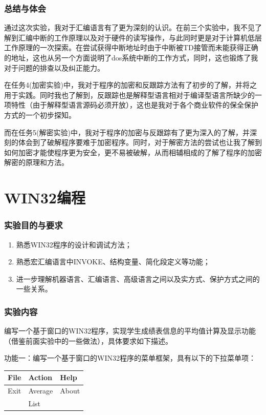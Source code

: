 \documentclass{article}
\begin{document}
	\section{总结与体会}
	通过这次实验，我对于汇编语言有了更为深刻的认识。在前三个实验中，我不见了解到汇编中断的工作原理以及对于硬件的读写操作，与此同时更是对于计算机低层工作原理的一次探索。在尝试获得中断地址时由于中断被TD接管而未能获得正确的地址，这也从另一个方面说明了dos系统中断的工作方式，同时，这也锻炼了我对于问题的排查以及纠正能力。\par
	在任务4(加密实验)中，我对于程序的加密和反跟踪方法有了初步的了解，并将之用于实践。同时我也了解到，反跟踪也是解释型语言相对于编译型语言所缺少的一项特性（由于解释型语言源码必须开放），这也是我对于各个商业软件的保全保护方式的一个初步探知。\par
	而在任务5(解密实验)中，我对于程序的加密与反跟踪有了更为深入的了解，并深刻的体会到了破解程序要难于加密程序。同时，对于解密方法的尝试也让我了解到如何加密才能使程序更为安全，更不易被破解，从而相辅相成的了解了程序的加密解密的原理和方法。


\newpage
\part{WIN32编程}

	\section{实验目的与要求}
	\begin{enumerate}
		\item 熟悉WIN32程序的设计和调试方法；
		\item 熟悉宏汇编语言中INVOKE、结构变量、简化段定义等功能；
		\item 进一步理解机器语言、汇编语言、高级语言之间以及实方式、保护方式之间的一些关系。
	\end{enumerate}

	\section{实验内容}
	编写一个基于窗口的WIN32程序，实现学生成绩表信息的平均值计算及显示功能（借鉴前面实验中的一些做法），具体要求如下描述。\par
	功能一：编写一个基于窗口的WIN32程序的菜单框架，具有以下的下拉菜单项：\par
	\begin{tabular}{l | l | l}
		File & Action & Help \\ \midrule
		Exit & Average & About \\ \cmidrule{2-2}
		& List &
	\end{tabular}
\end{document}
